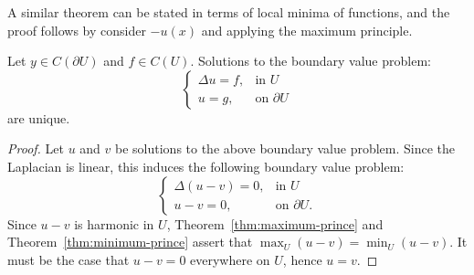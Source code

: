 \begin{remark}
 	A similar theorem can be stated in terms of local minima of functions, and the proof follows by consider $-u(x)$ and applying the maximum principle.
 \end{remark}

 \begin{corollary}\label{cor:unique}
 	Let $y \in C(\partial U)$ and $f \in C(U)$. Solutions to the boundary value problem:
	\[
		\begin{cases}
			\Delta u = f,& \text{in }U\\
			u=g,& \text{on }\partial U
		\end{cases}
	\] 
	are unique.
\end{corollary}
	\begin{proof}
		Let $u$ and $v$ be solutions to the above boundary value problem. Since the Laplacian is linear, this induces the following boundary value problem:
		\[
			\begin{cases}
				\Delta(u-v) = 0,& \text{in }U\\
				u-v = 0,& \text{on }\partial U.
			\end{cases}
		\] 
		Since $u-v$ is harmonic in $U$, Theorem~\ref{thm:maximum-prince} and Theorem~\ref{thm:minimum-prince} assert that $\max_U (u-v) = \min_U (u-v)$. It must be the case that $u-v = 0$ everywhere on $U$, hence $u=v$. 
	\end{proof}

